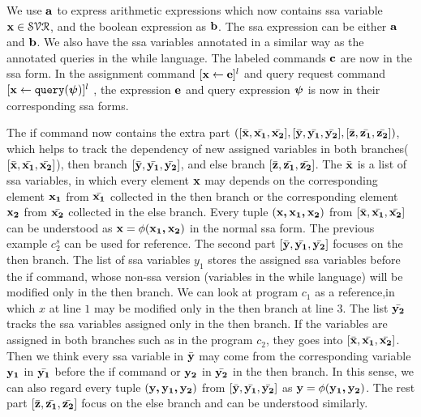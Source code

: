\documentclass[a4paper,11pt]{article}
\begin{document}
%
%
We use $\boldsymbol{\mathbf{a}}$ to express arithmetic expressions which now contains ssa variable $\boldsymbol{\mathbf{x}} \in \mathcal{SVR}$, 
and the boolean expression as $\boldsymbol{\mathbf{b}}$. 
%
The ssa expression can be either $\boldsymbol{\mathbf{a}}$ and $\boldsymbol{\mathbf{b}}$. 
We also have the ssa variables annotated in a similar way as the annotated queries in the while language.
%
The labeled commands $\boldsymbol{\mathbf{c}}$ are now in the ssa form. 
In the assignment command $[\mathrel{ \boldsymbol{\mathbf{x}} \leftarrow  \boldsymbol{\mathbf{e}} }]^{l}$ and query request command 
$[\mathrel{ {\boldsymbol{\mathbf{x}}}  \leftarrow {\tt query}({\boldsymbol{\mathbf{\psi}}}) }]^{l}$ , 
the expression ${\boldsymbol{\mathbf{e}}}$ and query expression 
$\boldsymbol{\mathbf{\psi}}$ is now in their corresponding ssa forms. 

{
The if command now contains the extra part 
$([\bar{\boldsymbol{\mathbf{x}}}, \bar{\boldsymbol{\mathbf{x_1}}}, \bar{\boldsymbol{\mathbf{x_2}}}] , 
[\bar{\boldsymbol{\mathbf{y}}}, \bar{\boldsymbol{\mathbf{y_1}}}, \bar{\boldsymbol{\mathbf{y_2}}}],
[\bar{\boldsymbol{\mathbf{z}}}, \bar{\boldsymbol{\mathbf{z_1}}}, \bar{\boldsymbol{\mathbf{z_2}}}] )$, 
which helps to track the dependency of new assigned variables in both branches($[\bar{\boldsymbol{\mathbf{x}}}, \bar{\boldsymbol{\mathbf{x_1}}}, \bar{\boldsymbol{\mathbf{x_2}}}]$), 
then branch $[\bar{\boldsymbol{\mathbf{y}}}, \bar{\boldsymbol{\mathbf{y_1}}}, \bar{\boldsymbol{\mathbf{y_2}}}]$, 
and else branch $[\bar{\boldsymbol{\mathbf{z}}}, \bar{\boldsymbol{\mathbf{z_1}}}, \bar{\boldsymbol{\mathbf{z_2}}}] $. 
The $\bar{\boldsymbol{\mathbf{x}}}$ is a list of ssa variables, in which every element $\boldsymbol{\mathbf{x}}$ may depends on the corresponding element $\boldsymbol{\mathbf{x_1}}$ from $\bar{\boldsymbol{\mathbf{x_1}}}$ collected in the then branch or the corresponding element $\boldsymbol{\mathbf{x_2}}$ from $\bar{\boldsymbol{\mathbf{x_2}}}$ collected in the else branch. 
%
Every tuple $(\boldsymbol{\mathbf{x,x_1,x_2 }})$ from $[\bar{\boldsymbol{\mathbf{x}}}, \bar{\boldsymbol{\mathbf{x_1}}}, \bar{\boldsymbol{\mathbf{x_2}}}]$ can be understood as $\boldsymbol{\mathbf{x}} = \phi(\boldsymbol{\mathbf{x_1,x_2}})$ in the normal ssa form. 
The previous example $c_2^{s}$ can be used for reference. 
The second part $[\bar{\boldsymbol{\mathbf{y}}}, \bar{\boldsymbol{\mathbf{y_1}}}, \bar{\boldsymbol{\mathbf{y_2}}}]$ focuses on the then branch. 
The list of ssa variables $y_1$ stores the assigned ssa variables before the if command, whose non-ssa version (variables in the while language) will be modified only in the then branch. 
We can look at program $c_1$ as a reference,in which $x$ at line $1$ may be modified only in the then branch at line $3$. 
The list $\bar{\boldsymbol{\mathbf{y_2}}}$ tracks the ssa variables assigned only in the then branch. 
If the variables are assigned in both branches such as in the program $c_2$, they goes into $[\bar{\boldsymbol{\mathbf{x}}}, \bar{\boldsymbol{\mathbf{x_1}}}, \bar{\boldsymbol{\mathbf{x_2}}}]$. Then we think every ssa variable in $\bar{\boldsymbol{\mathbf{y}}}$ may come from the corresponding variable $\boldsymbol{\mathbf{y_1}}$ in $\bar{\boldsymbol{\mathbf{y_1}}}$ before the if command or $\boldsymbol{\mathbf{y_2}}$ in $\bar{\boldsymbol{\mathbf{y_2}}}$ in the then branch. 
In this sense, we can also regard every tuple $(\boldsymbol{\mathbf{y,y_1,y_2 }})$ from $[\bar{\boldsymbol{\mathbf{y}}}, \bar{\boldsymbol{\mathbf{y_1}}}, \bar{\boldsymbol{\mathbf{y_2}}}]$ as $\boldsymbol{\mathbf{y}} = \phi(\boldsymbol{\mathbf{y_1,y_2}})$. 
The rest part $[\bar{\boldsymbol{\mathbf{z}}}, \bar{\boldsymbol{\mathbf{z_1}}}, \bar{\boldsymbol{\mathbf{z_2}}}]$ focus on the else branch and can be understood similarly. 
}
\end{document}
